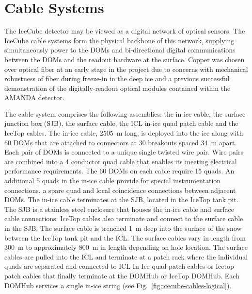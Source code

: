
 
\section{Cable Systems}

The IceCube detector may be viewed as a digital network of optical
sensors. The IceCube cable systems form the physical backbone of this
network, supplying simultaneously power to the DOMs and bi-directional
digital communications between the DOMs and the readout hardware at the
surface. Copper was chosen over optical fiber at an early stage in the
project due to concerns with mechanical robustness of fiber during
freeze-in in the deep ice and a previous successful demonstration of the
digitally-readout optical modules contained within the AMANDA detector.

The cable system comprises the following assemblies: the in-ice cable,
the surface junction box (SJB), the surface cable, the ICL in-ice quad patch
cable and the IceTop cables. The in-ice cable, 2505~m long, is deployed
into the ice along with 60 DOMs that are attached to connectors at 30
breakouts spaced 34~m apart. Each pair of DOMs is connected to a unique
single twisted wire pair. Wire pairs are combined into a 4 conductor quad
cable that enables its meeting electrical performance requirements. The 60
DOMs on each cable require 15 quads. An additional 5 quads in the
in-ice cable provide for special instrumentation connections, a spare quad
and local coincidence connections between adjacent DOMs. The in-ice
cable terminates at the SJB, located
in the IceTop tank pit. The SJB is a stainless steel
enclosure that houses the in-ice cable and surface cable
connections. IceTop cables also terminate and connect to the surface cable
in the SJB. The surface cable is trenched 1~m deep into the
surface of the snow between the IceTop tank pit and the ICL. The surface
cables vary in length from 300~m to approximately 800~m in length depending on hole location. The surface cables are
pulled into the ICL and terminate at a patch rack where the individual
quads are separated and connected to ICL In-Ice quad patch cables or Icetop
patch cables that finally terminate at the DOMHub or IceTop DOMHub. Each
DOMHub services a single in-ice string (see
Fig.~\ref{fig:icecube-cables-logical}). 


